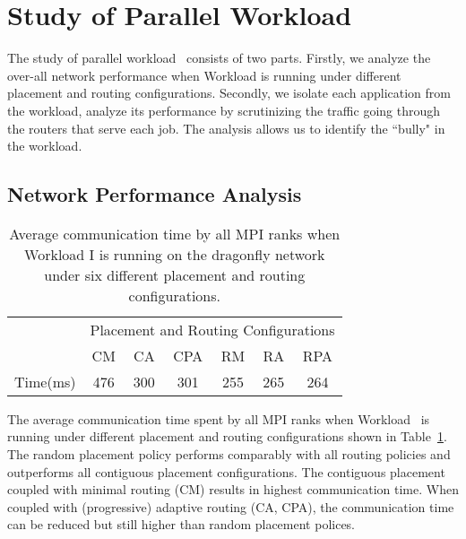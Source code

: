 
\section{Study of Parallel Workload~}
\label{sec:workload-1}

The study of parallel workload~ consists of two parts. Firstly, we analyze the over-all network performance when Workload  is running under different placement and routing configurations. Secondly, we isolate each application from the workload, analyze its performance  by scrutinizing the traffic going through the routers that serve each job. The analysis allows us to identify the ``bully" in the workload. 



\subsection{Network Performance Analysis}
\label{sec: workload-1 network analysis}

\iffalse

\begin{table}[ht]
\begin{center}
\caption{Average communication time by all MPI ranks when Workload I is running on the dragonfly network under six different placement and routing configurations.} 
\label{tab:wkld-commtime}
\begin{tabular}{l c c c c c c }
\toprule %
\toprule
&\multicolumn{6}{c}{Placement and Routing Configurations} \\ 
\cmidrule(l){2-7}
          & CM & CA & CPA & RM & RA & RPA \\ %
\midrule %
Time(ms)  & 476  & 300  & 301  & 255  & 265  & 264  \\ %

\midrule %
\bottomrule %
\end{tabular}
\end{center}
\end{table}

The average communication time spent by all MPI ranks when Workload~ is running under different placement and routing configurations shown in Table~\ref{tab:wkld-commtime}. The random placement policy performs comparably with all routing policies and outperforms all contiguous placement configurations. The contiguous placement coupled with minimal routing (CM) results in highest communication time. When coupled with (progressive) adaptive routing (CA, CPA), the communication time can be reduced but still higher than random placement polices. 


